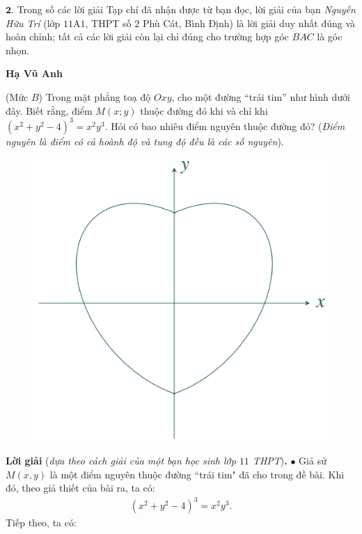 \begin{multicols}{2}
	\vskip 0.05cm
	$\pmb{2.}$ Trong số các lời giải Tạp chí đã nhận được từ bạn đọc, lời giải của bạn \textit{Nguyễn Hữu Trí} (lớp $11$A$1$, THPT số $2$ Phù Cát, Bình Định) là lời giải duy nhất đúng và hoàn chỉnh; tất cả các lời giải còn lại chỉ đúng cho trường hợp góc $BAC$ là góc nhọn.
	\begin{flushright}
		\textbf{\color{thachthuctoanhoc}Hạ Vũ Anh}
	\end{flushright}
	{}
	(Mức $B$) Trong mặt phẳng toạ độ $Oxy$, cho một đường ``trái tim'' như hình dưới đây. Biết rằng, điểm $M(x;y)$ thuộc đường đó khi và chỉ khi $\left(x^2\!+\!y^2\!-\!4\right)^{\!3}\!=\! x^2y^3$. Hỏi có bao nhiêu điểm nguyên thuộc đường đó?  
	\vskip 0.05cm
	({\it Điểm nguyên là điểm có cả hoành độ và tung độ đều là các số nguyên}).
	\begin{figure}[H]
		\centering
		\vspace*{-5pt}
		\captionsetup{labelformat= empty, justification=centering}
		\includegraphics[width=0.8\linewidth]{P1}
	\end{figure}
	\textbf{\color{thachthuctoanhoc}Lời giải} (\textit{dựa theo cách giải của một bạn học sinh lớp $11$ THPT})\textbf{\color{thachthuctoanhoc}.}
	\vskip 0.05cm
	$\bullet$ Giả sử $M(x, y)$ là một điểm nguyên thuộc đường ``trái tim" đã cho trong đề bài. Khi đó, theo giả thiết của bài ra, ta có:
	\begin{align*}
		{\left( {{x^2} + {y^2} - 4} \right)^3} = {x^2}{y^3}. \tag{$1$}
	\end{align*}
	Tiếp theo, ta có:
	\begin{align*}

\end{align*}
\end{multicols}
